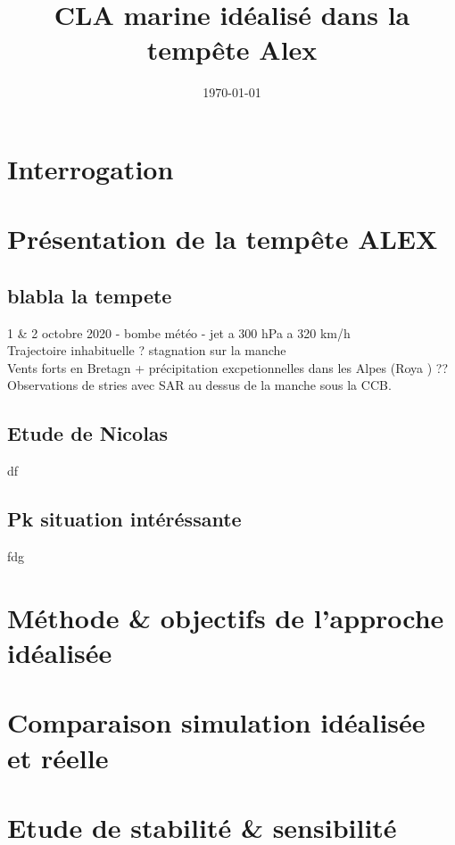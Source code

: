 
\usepackage[style=authoryear, backend=biber]{biblatex}

\graphicspath{{FIGURES/}}



\title{CLA marine idéalisé dans la tempête Alex}
\date{\today}

\maketitle
\tableofcontents

\newpage

\section{Interrogation}


\section{Présentation de la tempête ALEX}

\subsection{blabla la tempete}
1 \& 2 octobre 2020 - bombe météo - jet a 300 hPa a 320 km/h  \\
Trajectoire inhabituelle ? stagnation sur la manche \\
Vents forts en Bretagn + précipitation excpetionnelles dans les Alpes (Roya ) ?? \\
Observations de stries avec SAR  au dessus de la manche sous la CCB. 

\subsection{Etude de Nicolas}

df
\subsection{Pk situation intéréssante}
fdg


\section{Méthode \& objectifs de l'approche idéalisée}

\section{Comparaison simulation idéalisée et réelle}

\section{Etude de stabilité \& sensibilité}







